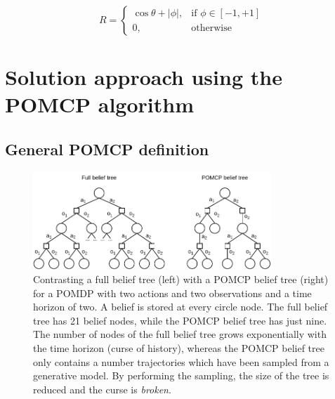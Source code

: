 \begin{equation}
    \label{eq:reward}
    R = 
    \begin{cases}
        \cos \theta + |\phi|,& \text{if } \phi \in [-1,+1]\\
        0,              & \text{otherwise}
    \end{cases}
\end{equation}


\section{Solution approach using the POMCP algorithm}

\subsection{General POMCP definition}
\label{sec:pomcp}




\begin{figure}[htbp]
    \centering
    \includegraphics[width=0.8\textwidth]{figures/pomcp_belief_tree.pdf}
    \caption[A full belief tree in contrast with a POMCP belief tree]{Contrasting a full belief tree (left) with a POMCP belief tree (right) for a POMDP with two actions and two observations and a time horizon of two. A belief is stored at every circle node. The full belief tree has 21 belief nodes, while the POMCP belief tree has just nine. The number of nodes of the full belief tree grows exponentially with the time horizon (curse of history), whereas the POMCP belief tree only contains a number trajectories which have been sampled from a generative model. By performing the sampling, the size of the tree is reduced and the curse is \textit{broken}.}
    \label{fig:full_vs_pomcp}
\end{figure}

